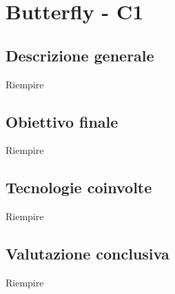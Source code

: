 \section{Butterfly - C1} \label{c1}
    \subsection{Descrizione generale}
    Riempire

    \subsection{Obiettivo finale}
    Riempire

    \subsection{Tecnologie coinvolte}
    Riempire

    \subsection{Valutazione conclusiva}
    Riempire
